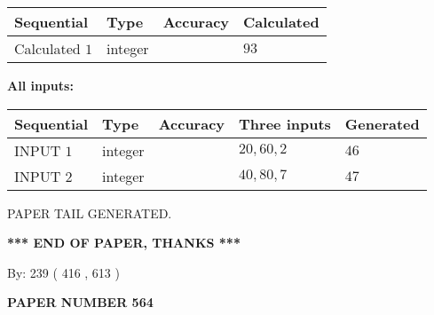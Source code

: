\documentclass{ctexart}
\begin{document}
   
   
   
\noindent{}
   
   
  
  
\noindent\begin{tabular}{|l|l|l|l|}
\hline
 Sequential & Type & Accuracy & Calculated \\ 
\hline
 
 
  Calculated $  1 $ & integer &  & 
  $ 93 $ 
 \\  \hline  
 \end{tabular}
   
   
   
   
\noindent\vspace{0.1in}\hspace{-0.08in} {\textbf{\Large{All inputs: }}}
   
   
  
  
\noindent\begin{tabular}{|l|l|l|l|l|}
\hline
 Sequential & Type & Accuracy & Three inputs & Generated \\ 
\hline
 
 
  INPUT $  1 $ & integer &  & $
 20
 , 
 60
 , 
 2
 $ & $ 46 $ 
 \\  \hline  
 
 
  INPUT $  2 $ & integer &  & $
 40
 , 
 80
 , 
 7
 $ & $ 47 $ 
 \\  \hline  
 \end{tabular}
   
   
   
   
   
   
 \vspace{0.2in}
 
   
   
\vspace{2.0in} PAPER TAIL GENERATED.
   
   
   
   
\vspace{1.0in} 
{\textbf{\large{ *** END OF PAPER, THANKS *** }}} 
   
   
\hspace{1.0in} By: 
 239 ( 416 ,  613 )
   
   
   
   
\newpage 
\setcounter{page}{ 
   564001 } 
   
   
   
   
 {\textbf{ \Large{ PAPER NUMBER  564  }}}
   
\end{document}
